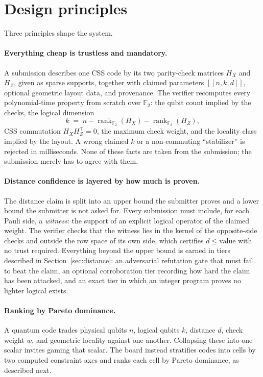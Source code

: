 \documentclass{ceurart}
\newcommand{\GF}{\mathbb{F}_2}
\newcommand{\HX}{H_X}
\newcommand{\HZ}{H_Z}
\newcommand{\ranktwo}{\operatorname{rank}_{\GF}}
\begin{document}
\section{Design principles}

Three principles shape the system.

\paragraph{Everything cheap is trustless and mandatory.} A submission
describes one CSS code by its two parity-check matrices $\HX$ and $\HZ$,
given as sparse supports, together with claimed parameters $[[n,k,d]]$,
optional geometric layout data, and provenance. The verifier recomputes every
polynomial-time property from scratch over $\GF$: the qubit count implied by
the checks, the logical dimension
\begin{equation}
    k \;=\; n-\ranktwo(\HX)-\ranktwo(\HZ),
\end{equation}
CSS commutation $\HX\HZ^{\top}=0$, the maximum check weight, and the locality
class implied by the layout. A wrong claimed $k$ or a non-commuting
``stabilizer'' is rejected in milliseconds. None of these facts are taken from
the submission; the submission merely has to agree with them.

\paragraph{Distance confidence is layered by how much is proven.} The
distance claim is split into an upper bound the submitter proves and a lower
bound the submitter is not asked for. Every submission must include, for each
Pauli side, a \emph{witness}: the support of an explicit logical operator of
the claimed weight. The verifier checks that the witness lies in the kernel
of the opposite-side checks and outside the row space of its own side, which
certifies $d \le \text{value}$ with no trust required. Everything beyond the
upper bound is earned in tiers described in
Section~\ref{sec:distance}: an adversarial refutation gate that must fail to
beat the claim, an optional corroboration tier recording how hard the claim
has been attacked, and an exact tier in which an integer program proves no
lighter logical exists.

\paragraph{Ranking by Pareto dominance.} A quantum code trades physical
qubits $n$, logical qubits $k$, distance $d$, check weight $w$, and geometric
locality against one another. Collapsing these into one scalar invites gaming
that scalar. The board instead stratifies codes into cells by two computed
constraint axes and ranks each cell by Pareto dominance, as described next.
\end{document}
